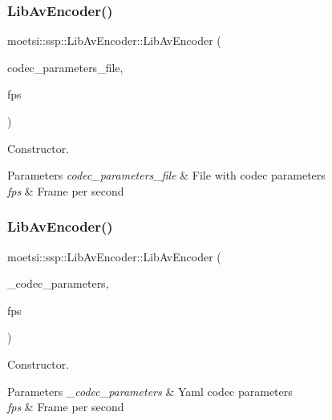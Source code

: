 \subsubsection{\texorpdfstring{Lib\+Av\+Encoder()}{LibAvEncoder()}\hspace{0.1cm}{\footnotesize\ttfamily [1/2]}}
{\footnotesize\ttfamily moetsi\+::ssp\+::\+Lib\+Av\+Encoder\+::\+Lib\+Av\+Encoder (\begin{DoxyParamCaption}\item[{std\+::string}]{codec\+\_\+parameters\+\_\+file,  }\item[{unsigned int}]{fps }\end{DoxyParamCaption})}



Constructor. 


\begin{DoxyParams}{Parameters}
{\em codec\+\_\+parameters\+\_\+file} & File with codec parameters \\
\hline
{\em fps} & Frame per second \\
\hline
\end{DoxyParams}
\mbox{\label{classmoetsi_1_1ssp_1_1LibAvEncoder_a2d5ec3b4a92f7b9378fd397624bd4ea4}} 
\subsubsection{\texorpdfstring{Lib\+Av\+Encoder()}{LibAvEncoder()}\hspace{0.1cm}{\footnotesize\ttfamily [2/2]}}
{\footnotesize\ttfamily moetsi\+::ssp\+::\+Lib\+Av\+Encoder\+::\+Lib\+Av\+Encoder (\begin{DoxyParamCaption}\item[{Y\+A\+M\+L\+::\+Node \&}]{\+\_\+codec\+\_\+parameters,  }\item[{unsigned int}]{fps }\end{DoxyParamCaption})}



Constructor. 


\begin{DoxyParams}{Parameters}
{\em \+\_\+codec\+\_\+parameters} & Yaml codec parameters \\
\hline
{\em fps} & Frame per second \\
\hline
\end{DoxyParams}


